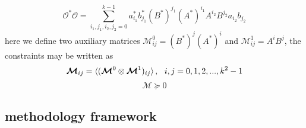 \documentclass[aps,prl, preprint,amsmath, amssymb]{revtex4-2}
\begin{document}
\begin{equation}
    \mathcal{O}^* \mathcal{O} = \sum_{i_1, j_1, i_2, j_2 = 0}^{k - 1} a_{i_1}^* b_{j_1}^* (B^*)^{j_1} (A^*)^{i_1} A^{i_2} B^{j_2} a_{i_2} b_{j_2}
\end{equation}
here we define two auxiliary matrices $\bm{\mathcal{M}}_{ij}^0 = (B^*)^j (A^*)^i$ and $\bm{\mathcal{M}}_{ij}^1 = A^i B^j$, the constraints may be written as
\begin{equation}
    \bm{\mathcal{M}}_{ij} = \braket{(\bm{\mathcal{M}}^0 \otimes \bm{\mathcal{M}}^1)_{ij}}, \ \ i, j = 0, 1, 2, ..., k^2 - 1
\end{equation}
\begin{equation}
    \bm{\mathcal{M}} \succeq 0
\end{equation}

\subsection{methodology framework}
\end{document}
